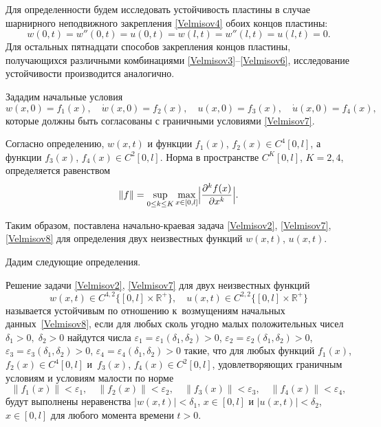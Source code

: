 Для определенности будем исследовать устойчивость пластины в случае шарнирного неподвижного закрепления \eqref{Velmisov4} обоих концов пластины:
\begin{equation}
\label{Velmisov7} 
w(0,t)=w''(0,t)=u(0,t)=w(l,t)=w''(l,t)=u(l,t)=0.
\end{equation}
Для остальных пятнадцати способов закрепления концов пластины, получающихся различными комбинациями \eqref{Velmisov3}--\eqref{Velmisov6}, исследование устойчивости производится аналогично.

Зададим начальные условия
\begin{equation} \label{Velmisov8} 
w(x,0)=f_{1} (x),\quad \dot{w}(x,0)=f_{2} (x), \quad  u(x,0)=f_{3} (x),\quad \dot{u}(x,0)=f_{4} (x), 
\end{equation} 
которые должны быть согласованы с граничными условиями  \eqref{Velmisov7}. 

Согласно определению, $w(x,t)$ и функции $f_{1} (x)$, $f_{2} (x)\in C^{4} [0,l]$, а
функции  $f_{3} (x)$, $ f_{4} (x)\in C^{2} [0,l]$. 
Норма в пространстве $C^{K} [0,l]$, $K =2 ,4 $, определяется равенством 
$$ \| f \| =\mathop{\sup }\limits_{0\le k\le K} \mathop{\max }\limits_{x\in [0,l]}  
\Bigl|\frac{\partial ^{k} f(x)}{\partial x^{k} } \Bigr|.$$

Таким образом, поставлена начально-краевая задача \eqref{Velmisov2}, \eqref{Velmisov7}, \eqref{Velmisov8} для определения двух неизвестных функций $w(x,t)$, $u(x,t)$.

\smallskip


 Дадим следующие определения.

\smallskip

\hypertarget{Velm:def1}{}

Решение задачи \eqref{Velmisov2}, \eqref{Velmisov7} для двух неизвестных функций 
\begin{equation}
\label{VelmisovKlass}
w(x,t)\in C^{4,2} \{[0,l]\times \mathbb R^{+} \},\quad   
u(x,t)\in C^{2,2} \{[0,l]\times \mathbb R^{+} \}
\end{equation}
называется устойчивым по отношению к~возмущениям начальных данных~\eqref{Velmisov8}, если для любых сколь угодно малых положительных чисел $\delta _{1} >0,\; \delta _{2} >0$ найдутся числа $\varepsilon _{1} =\varepsilon _{1} (\delta _{1} ,\delta _{2} )>0$, $\varepsilon _{2} =\varepsilon _{2} (\delta _{1} ,\delta _{2} )>0$, $\varepsilon _{3} =\varepsilon _{3} (\delta _{1} ,\delta _{2} )>0$, $\varepsilon _{4} =\varepsilon _{4} (\delta _{1} ,\delta _{2} )>0$ такие, что для любых функций $f_{1} (x)$, $f_{2} (x)\in C^{4} [0,l]$ и~$f_{3} (x)$, $f_{4} (x)\in C^{2} [0,l]$, удовлетворяющих граничным условиям и условиям малости по норме 
\[
\| f_{1} (x)\| <\varepsilon _{1} , \quad 
\| f_{2} (x)\| <\varepsilon _{2} , \quad  
\| f_{3} (x)\| <\varepsilon _{3} ,\quad 
\| f_{4} (x)\| <\varepsilon _{4} ,
\]
будут выполнены неравенства 
$|w(x,t)|<\delta _{1}$, $x\in [0,l]$ и 
$|u(x,t)|<\delta _{2}$, $x\in [0,l]$ для любого момента времени $t>0$.

